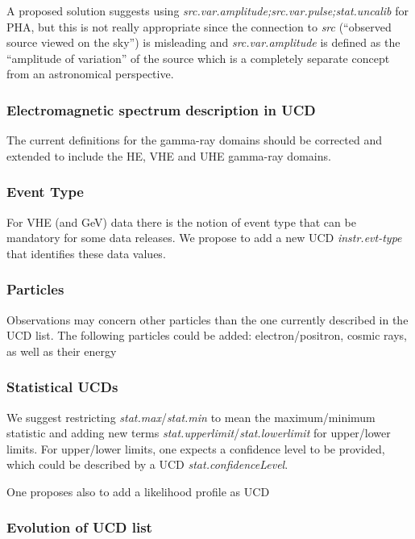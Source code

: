 \documentclass[11pt,a4paper]{ivoa}
\begin{document}
A proposed solution suggests using {\em src.var.amplitude;src.var.pulse;stat.uncalib} for PHA, but this is not really appropriate since the connection to {\em src\/} (``observed source viewed on the sky'') is misleading and {\em src.var.amplitude\/} is defined as the ``amplitude of variation'' of the source which is a completely separate concept from an astronomical perspective.

\subsubsection{Electromagnetic spectrum description in UCD}

The current definitions for the gamma-ray domains should be corrected and extended to include the \gls{HE}, \gls{VHE} and \gls{UHE} gamma-ray domains.

\subsubsection{Event Type}

For \gls{VHE} (and GeV) data there is the notion of event type that can be mandatory for some data releases.  We propose to add a new UCD {\em instr.evt-type\/} that identifies these data values.

\subsubsection{Particles}

Observations may concern other particles than the one currently described in the UCD list. The following particles could be added: electron/positron, cosmic rays, as well as their energy

\subsubsection{Statistical UCDs}

We suggest restricting {\em stat.max}/{\em stat.min} to mean the maximum/minimum statistic and adding new terms {\em stat.upperlimit}/{\em stat.lowerlimit} for upper/lower limits. For upper/lower limits, one expects a confidence level to be provided, which could be described by a UCD {\em stat.confidenceLevel}.

One proposes also to add a likelihood profile as UCD

\subsubsection{Evolution of UCD list}
\end{document}
